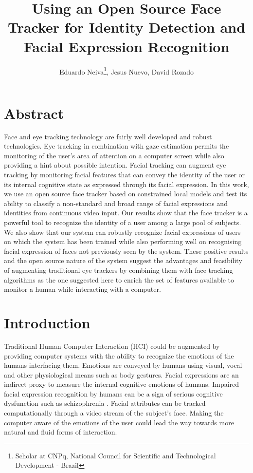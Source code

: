 \documentclass[]{article}
\title{Using an Open Source Face Tracker for Identity Detection and Facial
Expression Recognition}
\author{Eduardo Neiva\footnote{Scholar at CNPq, National
Council for Scientific and Technological Development - Brazil}, Jesus Nuevo, David Rozado}
\begin{document}
\maketitle

\section{Abstract}

Face and eye tracking technology are fairly well developed and robust technologies. Eye tracking in combination with
gaze estimation permits the monitoring of the user's area of attention on a computer screen while also providing a hint
about possible intention. Facial tracking can augment eye tracking by monitoring facial features that can convey the
identity of the user or its internal cognitive state as expressed through its facial expression. In this work, we use an
open source face tracker based on constrained local models and test its ability to classify a non-standard and broad
range of facial expressions and identities from continuous video input. Our results show that the face tracker is a
powerful tool to recognize the identity of a user among a large pool of subjects. We also show that our system can
robustly recognize facial expressions of users on which the system has been trained while also performing well on
recognising facial expression of faces not previously seen by the system. These positive results and the open source
nature of the system suggest the advantages and feasibility of augmenting traditional eye trackers by combining them
with face tracking algorithms as the one suggested here to enrich the set of features available to monitor a human while
interacting with a computer.


\section{Introduction}
Traditional Human Computer Interaction (HCI) could be augmented by providing computer systems with the ability to
recognize the emotions of the humans interfacing them. Emotions are conveyed by humans using visual, vocal
and other physiological means such as body gestures. Facial expressions are an indirect proxy to measure the internal
cognitive emotions of humans. Impaired facial expression recognition by humans can be a sign of serious cognitive
dysfunction such as schizophrenia \cite{Edwards2002789}.  Facial attributes can be tracked computationally through a
video stream of the subject's face. Making the computer aware of the emotions of the user could lead the way towards
more natural and fluid forms of interaction.
\end{document}
